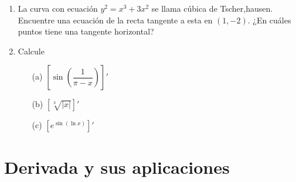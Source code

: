\documentclass[10pt,twoside]{SelfArx} %
\begin{document}
\begin{enumerate}
	\item	La curva con ecuación $ y^{2}=x^{3}+3x^{2} $ se llama cúbica de Tscher,hausen. Encuentre una ecuación de la recta tangente a esta en $ (1,-2) $. ¿En cuáles puntos tiene una tangente horizontal?
	
	\item	Calcule
	\begin{enumerate}
		\item[(a)]	$ \left [ \sin\left (\dfrac{1}{\pi-x}\right )\right ]' $
		\item[(b)]	$ \left [ \sqrt[3]{|x|}\right ]' $
		
		\item[(c)]	$ \left [ e^{\sin(\ln x)}\right ]' $
	\end{enumerate}
	
	
\end{enumerate}


 \section{Derivada y sus aplicaciones}
\end{document}
